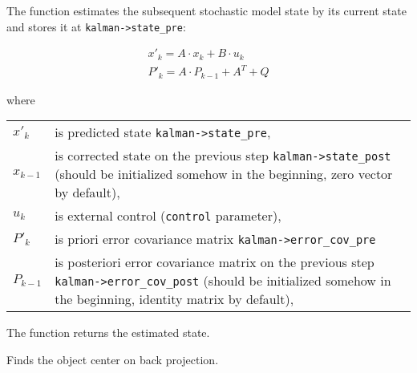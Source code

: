 \begin{description}
\end{description}

The function estimates the subsequent stochastic model state by its current state and stores it at \texttt{kalman->state\_pre}:

\[
\begin{array}{l}
x'_k=A \cdot x_k+B \cdot u_k\\
P'_k=A \cdot P_{k-1}+A^T + Q
\end{array}
\]

where

\begin{tabular}{l p{5 in}}
$x'_k$ & is predicted state \texttt{kalman->state\_pre},\\
$x_{k-1}$ & is corrected state on the previous step \texttt{kalman->state\_post}
                (should be initialized somehow in the beginning, zero vector by default),\\
$u_k$ & is external control (\texttt{control} parameter),\\
$P'_k$ & is priori error covariance matrix \texttt{kalman->error\_cov\_pre}\\
$P_{k-1}$ & is posteriori error covariance matrix on the previous step \texttt{kalman->error\_cov\_post}
                (should be initialized somehow in the beginning, identity matrix by default),
\end{tabular}

The function returns the estimated state.

Finds the object center on back projection.


\begin{description}
\end{description}


